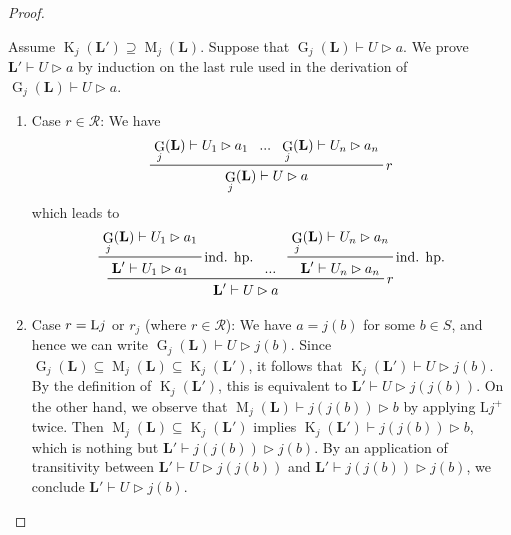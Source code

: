 \documentclass[runningheads]{llncs}
\DeclareMathOperator{\Glivenko}{G}
\DeclareMathOperator{\Kleisli}{K}
\DeclareMathOperator{\Maximal}{M}
\begin{document}
\begin{proof}
\begin{enumerate}
        Assume $\Kleisli_j(\mathbf{L}')\supseteq\Maximal_j(\mathbf{L})$. 
        Suppose that $\Glivenko_j(\mathbf{L})\vdash U\rhd a$. We prove $\mathbf{L}'\vdash U\rhd a$ by induction on the last rule used in the derivation of $\Glivenko_j(\mathbf{L})\vdash U\rhd a$.
        \begin{enumerate}
            \item Case $r\in \mathcal{R}$:
            We have
            \[
            \prftree[r]{\textnormal{$r$}}{\Glivenko_j(\mathbf{L})\vdash U_1\rhd a_1}{...}{\Glivenko_j(\mathbf{L})\vdash U_n\rhd a_n}{\Glivenko_j(\mathbf{L})\vdash U\rhd a}
            \]
            which leads to
            \[
            \prftree[r]{\textnormal{$r$}}{
                \prftree[r]{ind. hp.}{\Glivenko_j(\mathbf{L})\vdash U_1\rhd a_1}{\mathbf{L}'\vdash U_1\rhd a_1}
            }{...}{
                \prftree[r]{ind. hp.}{\Glivenko_j(\mathbf{L})\vdash U_n\rhd a_n}{\mathbf{L}'\vdash U_n\rhd a_n}
            }{\mathbf{L}'\vdash U\rhd a}
            \]
            \item Case $r=\textnormal{L$j$}$ or $r_j$ (where $r\in \mathcal{R}$): We have $a = j(b)$ for some $b \in S$, and hence we can write $\Glivenko_j(\mathbf{L}) \vdash U \rhd j(b)$. Since $\Glivenko_j(\mathbf{L}) \subseteq \Maximal_j(\mathbf{L}) \subseteq \Kleisli_j(\mathbf{L}')$, it follows that $\Kleisli_j(\mathbf{L}') \vdash U \rhd j(b)$. By the definition of $\Kleisli_j(\mathbf{L}')$, this is equivalent to $\mathbf{L}' \vdash U \rhd j(j(b))$. 
            On the other hand, we observe that $\Maximal_j(\mathbf{L})\vdash j(j(b))\rhd b$ by applying L$j^+$ twice. Then $\Maximal_j(\mathbf{L})\subseteq\Kleisli_j(\mathbf{L}')$ implies $\Kleisli_j(\mathbf{L}')\vdash j(j(b))\rhd b$, which is nothing but $\mathbf{L}'\vdash j(j(b))\rhd j(b)$.
            By an application of transitivity between $\mathbf{L}' \vdash U \rhd j(j(b))$ and $\mathbf{L}'\vdash j(j(b))\rhd j(b)$, we conclude $\mathbf{L}' \vdash U \rhd j(b)$.
            \qedhere
        \end{enumerate}
    \end{enumerate}
\end{proof}
\end{document}
